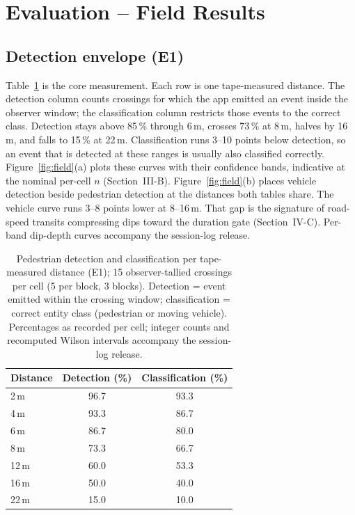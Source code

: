 \documentclass[conference,10pt]{IEEEtran}
\begin{document}
\section{Evaluation -- Field Results}
\subsection{Detection envelope (E1)}
Table~\ref{tab:det} is the core measurement. Each row is one tape-measured distance. The detection column counts crossings for which the app emitted an event inside the observer window; the classification column restricts those events to the correct class. Detection stays above 85\,\% through 6\,m,
crosses 73\,\% at 8\,m, halves by 16\,m, and falls to 15\,\% at 22\,m.
Classification runs 3--10 points below detection, so an event that is detected at
these ranges is usually also classified correctly. Figure~\ref{fig:field}(a) plots these
curves with their confidence bands, indicative at the nominal per-cell $n$
(Section~III-B). Figure~\ref{fig:field}(b) places vehicle
detection beside pedestrian detection at the distances both tables share. The
vehicle curve runs 3--8 points lower at 8--16\,m. That gap is the signature of
road-speed transits compressing dips toward the duration gate
(Section~IV-C).
Per-band dip-depth curves accompany the session-log release.

\begin{table}[t]
\centering
\caption{Pedestrian detection and classification per tape-measured distance (E1);
15 observer-tallied crossings per cell (5 per block, 3 blocks). Detection =
event emitted within the crossing window; classification = correct entity class (pedestrian or moving vehicle).
Percentages as recorded per cell; integer counts and recomputed Wilson
intervals accompany the session-log release.}
\label{tab:det}
\footnotesize
\begin{tabular}{@{}lcc@{}}
\toprule
\textbf{Distance} & \textbf{Detection (\%)} & \textbf{Classification (\%)} \\
\midrule
2\,m  & 96.7 & 93.3 \\
4\,m  & 93.3 & 86.7 \\
6\,m  & 86.7 & 80.0 \\
8\,m  & 73.3 & 66.7 \\
12\,m & 60.0 & 53.3 \\
16\,m & 50.0 & 40.0 \\
22\,m & 15.0 & 10.0 \\
\bottomrule
\end{tabular}
\end{table}
\end{document}
